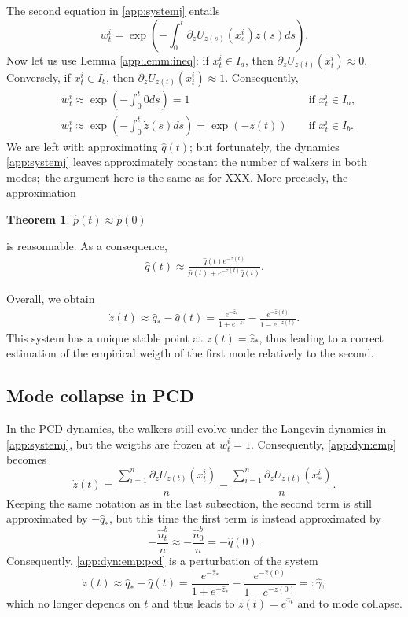 \documentclass[a4paper,11pt]{extarticle}
\newtheorem{theorem}{Theorem}
\begin{document}
The second equation in \eqref{app:systemj} entails
$$w^i_t = \exp\left( -\int_0^t \partial_z U_{z(s)}(x_s^i)\dot{z}(s)ds\right).$$
Now let us use Lemma \ref{app:lemm:ineq}: if $x_t^i \in I_a$, then $\partial_z U_{z(t)}(x_t^i) \approx 0$. Conversely, if $x_t^i\in I_b$, then $\partial_z U_{z(t)}(x_t^i)\approx 1$. Consequently, 
\begin{align}
    &w_t^i \approx \exp\left(- \int_0^t 0ds \right) = 1 &&\text{ if }x_t^i \in I_a, \\
    &w_t^i \approx \exp\left(- \int_0^t \dot{z}(s)ds \right) = \exp\left(-z(t)\right) &&\text{ if }x_t^i \in I_b. 
\end{align}
We are left with approximating $\hat{q}(t)$; but fortunately, the dynamics \eqref{app:systemj} leaves approximately constant the number of walkers in both modes; the argument here is the same as for XXX. More precisely, the approximation 
\begin{theorem}
    $\hat{p}(t)\approx \hat{p}(0)$ 
\end{theorem}
is reasonnable. As a consequence, 
\begin{align}
    \hat{q}(t)  \approx \frac{\hat{q}(t)e^{-z(t)}}{\hat{p}(t) + e^{-z(t)}\hat{q}(t)}.
\end{align}

Overall, we obtain
\begin{align}
    \dot{z}(t) \approx \hat{q}_* - \hat{q}(t) =  \frac{e^{-\hat{z}_*}}{1 + e^{-\hat{z}_*}} - \frac{e^{-\hat{z}(t)}}{1 - e^{-\hat{z}(t)}} .
\end{align}
This system has a unique stable point at $z(t)=\hat{z}_*$, thus leading to a correct estimation of the empirical weigth of the first mode relatively to the second. 

\subsection*{Mode collapse in PCD}
In the PCD dynamics, the walkers still evolve under the Langevin dynamics in \eqref{app:systemj}, but the weigths are frozen at $w_t^i = 1$. Consequently, \eqref{app:dyn:emp} becomes
\begin{equation}\label{app:dyn:emp:pcd}
    \dot{z}(t) =   \frac{\sum_{i=1}^n \partial_z U_{z(t)}(x_t^i)}{n} - \frac{\sum_{i=1}^n  \partial_z U_{z(t)}(x_*^i)}{n}. 
\end{equation}
Keeping the same notation as in the last subsection, the second term is still approximated by $-\hat{q}_*$, but this time the first term is instead approximated by 
$$-\frac{\hat{n}^b_t}{n} \approx -\frac{\hat{n}^b_0}{n} = - \hat{q}(0). $$
Consequently, \eqref{app:dyn:emp:pcd} is a perturbation of the system
$$\dot{z}(t) \approx \hat{q}_* - \hat{q}(t) =  \frac{e^{-\hat{z}_*}}{1 + e^{-\hat{z}_*}} - \frac{e^{-\hat{z}(0)}}{1 - e^{-\hat{z}(0)}}=:\hat{\gamma},$$
which no longer depends on $t$ and thus leads to $z(t) = e^{\hat{\gamma}t}$ and to mode collapse. 
\end{document}
